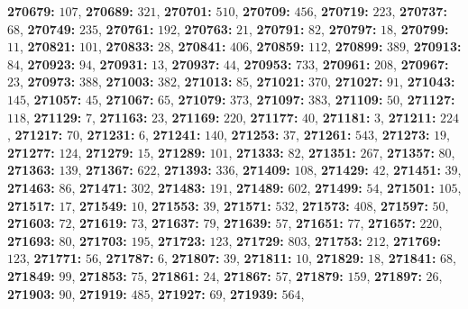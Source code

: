 \textsf{\bfseries 270679:} $107$, \textsf{\bfseries 270689:} $321$, \textsf{\bfseries 270701:} $510$, \textsf{\bfseries 270709:} $456$, \textsf{\bfseries 270719:} $223$, \textsf{\bfseries 270737:} $68$, \textsf{\bfseries 270749:} $235$, \textsf{\bfseries 270761:} $192$, \textsf{\bfseries 270763:} $21$, \textsf{\bfseries 270791:} $82$, \textsf{\bfseries 270797:} $18$, \textsf{\bfseries 270799:} $11$, \textsf{\bfseries 270821:} $101$, \textsf{\bfseries 270833:} $28$, \textsf{\bfseries 270841:} $406$, \textsf{\bfseries 270859:} $112$, \textsf{\bfseries 270899:} $389$, \textsf{\bfseries 270913:} $84$, \textsf{\bfseries 270923:} $94$, \textsf{\bfseries 270931:} $13$, \textsf{\bfseries 270937:} $44$, \textsf{\bfseries 270953:} $733$, \textsf{\bfseries 270961:} $208$, \textsf{\bfseries 270967:} $23$, \textsf{\bfseries 270973:} $388$, \textsf{\bfseries 271003:} $382$, \textsf{\bfseries 271013:} $85$, \textsf{\bfseries 271021:} $370$, \textsf{\bfseries 271027:} $91$, \textsf{\bfseries 271043:} $145$, \textsf{\bfseries 271057:} $45$, \textsf{\bfseries 271067:} $65$, \textsf{\bfseries 271079:} $373$, \textsf{\bfseries 271097:} $383$, \textsf{\bfseries 271109:} $50$, \textsf{\bfseries 271127:} $118$, \textsf{\bfseries 271129:} $7$, \textsf{\bfseries 271163:} $23$, \textsf{\bfseries 271169:} $220$, \textsf{\bfseries 271177:} $40$, \textsf{\bfseries 271181:} $3$, \textsf{\bfseries 271211:} $224$, \textsf{\bfseries 271217:} $70$, \textsf{\bfseries 271231:} $6$, \textsf{\bfseries 271241:} $140$, \textsf{\bfseries 271253:} $37$, \textsf{\bfseries 271261:} $543$, \textsf{\bfseries 271273:} $19$, \textsf{\bfseries 271277:} $124$, \textsf{\bfseries 271279:} $15$, \textsf{\bfseries 271289:} $101$, \textsf{\bfseries 271333:} $82$, \textsf{\bfseries 271351:} $267$, \textsf{\bfseries 271357:} $80$, \textsf{\bfseries 271363:} $139$, \textsf{\bfseries 271367:} $622$, \textsf{\bfseries 271393:} $336$, \textsf{\bfseries 271409:} $108$, \textsf{\bfseries 271429:} $42$, \textsf{\bfseries 271451:} $39$, \textsf{\bfseries 271463:} $86$, \textsf{\bfseries 271471:} $302$, \textsf{\bfseries 271483:} $191$, \textsf{\bfseries 271489:} $602$, \textsf{\bfseries 271499:} $54$, \textsf{\bfseries 271501:} $105$, \textsf{\bfseries 271517:} $17$, \textsf{\bfseries 271549:} $10$, \textsf{\bfseries 271553:} $39$, \textsf{\bfseries 271571:} $532$, \textsf{\bfseries 271573:} $408$, \textsf{\bfseries 271597:} $50$, \textsf{\bfseries 271603:} $72$, \textsf{\bfseries 271619:} $73$, \textsf{\bfseries 271637:} $79$, \textsf{\bfseries 271639:} $57$, \textsf{\bfseries 271651:} $77$, \textsf{\bfseries 271657:} $220$, \textsf{\bfseries 271693:} $80$, \textsf{\bfseries 271703:} $195$, \textsf{\bfseries 271723:} $123$, \textsf{\bfseries 271729:} $803$, \textsf{\bfseries 271753:} $212$, \textsf{\bfseries 271769:} $123$, \textsf{\bfseries 271771:} $56$, \textsf{\bfseries 271787:} $6$, \textsf{\bfseries 271807:} $39$, \textsf{\bfseries 271811:} $10$, \textsf{\bfseries 271829:} $18$, \textsf{\bfseries 271841:} $68$, \textsf{\bfseries 271849:} $99$, \textsf{\bfseries 271853:} $75$, \textsf{\bfseries 271861:} $24$, \textsf{\bfseries 271867:} $57$, \textsf{\bfseries 271879:} $159$, \textsf{\bfseries 271897:} $26$, \textsf{\bfseries 271903:} $90$, \textsf{\bfseries 271919:} $485$, \textsf{\bfseries 271927:} $69$, \textsf{\bfseries 271939:} $564$, 
